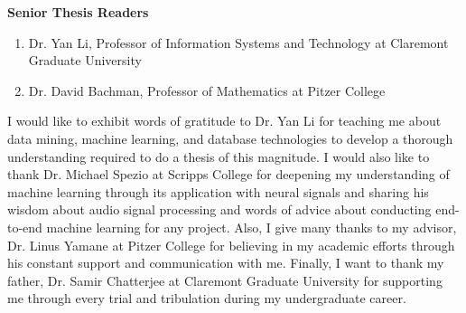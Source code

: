 \doublespacing
\setlength{\parindent}{1cm}

\begin{center}
  \textbf{Senior Thesis Readers} \par
  \begin{enumerate}
    \item Dr. Yan Li, Professor of Information Systems and Technology at Claremont Graduate University
    \item Dr. David Bachman, Professor of Mathematics at Pitzer College
  \end{enumerate}
\end{center}

\par

I would like to exhibit words of gratitude to Dr. Yan Li for teaching me about data mining, machine learning, and database technologies to develop a thorough understanding required to do a thesis of this magnitude. I would also like to thank Dr. Michael Spezio at Scripps College for deepening my understanding of machine learning through its application with neural signals and sharing his wisdom about audio signal processing and words of advice about conducting end-to-end machine learning for any project. Also, I give many thanks to my advisor, Dr. Linus Yamane at Pitzer College for believing in my academic efforts through his constant support and communication with me. Finally, I want to thank my father, Dr. Samir Chatterjee at Claremont Graduate University for supporting me through every trial and tribulation during my undergraduate career.

